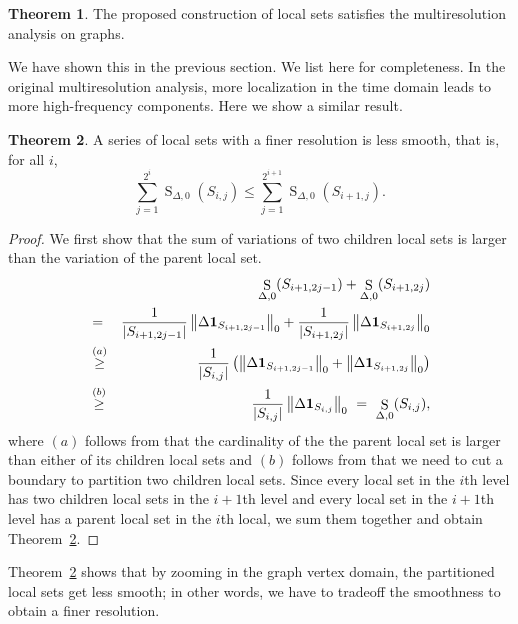 \documentclass[journal,twocolumn,10pt]{IEEEtran}
\theoremstyle{definition}
\newtheorem{myThm}{Theorem}
\DeclareMathOperator{\STV}{S}
\begin{document}
\begin{myThm}
\label{thm:MRA}
The proposed construction of local sets satisfies the multiresolution analysis on graphs.
\end{myThm}
We have shown this in the previous section. We list here for completeness. In the original multiresolution analysis, more localization in the  time domain leads to more high-frequency components. Here we show a similar result.
\begin{myThm}
\label{thm:smooth}
A series of local sets with a finer resolution is less smooth, that is, for all $i$,
\begin{equation*}
\sum_{j=1}^{2^i} \STV_{\Delta, 0} (S_{i,j}) \leq  \sum_{j=1}^{2^{i+1}}  \STV_{\Delta, 0}  (S_{i+1,j}) .
\end{equation*}
\end{myThm}
\begin{proof}
We first show that the sum of variations of two children local sets is larger than the variation of the parent local set.
\begin{eqnarray*}
&& \STV_{\Delta, 0} (S_{i+1,2j-1}) + \STV_{\Delta, 0} (S_{i+1,2j})  
\\
& = & \frac{1}{ |S_{i+1,2j-1}| }\left\| \Delta {\bf 1}_{ S_{i+1,2j-1} } \right\|_0 + 
\frac{1}{ |S_{i+1,2j}| }\left\| \Delta {\bf 1}_{ S_{i+1,2j} } \right\|_0
\\
& \stackrel{(a)}{ \geq } &  \frac{1}{ |S_{i,j}| }  \left(  \left\| \Delta {\bf 1}_{ S_{i+1,2j-1} } \right\|_0 + \left\| \Delta {\bf 1}_{ S_{i+1,2j} }  \right\|_0 \right)
\\
& \stackrel{(b)}{\geq} &  \frac{1}{ |S_{i,j}| }\left\| \Delta {\bf 1}_{S_{i,j}} \right\|_0 \ = \ \STV_{\Delta, 0}  (S_{i,j}),
\end{eqnarray*}
where $(a)$ follows from that the cardinality of the the parent local set is larger than either of its children local sets and $(b)$ follows from that we need to cut a boundary to partition two children local sets. Since every local set in the $i$th level has two children local sets in the $i+1$th level and every local set in the $i+1$th level has a parent local set in the $i$th local, we sum them together and obtain Theorem~\ref{thm:smooth}.
\end{proof}

Theorem~\ref{thm:smooth} shows that  by zooming in the graph vertex domain, the partitioned local sets get less smooth; in other words, we have to tradeoff the smoothness to obtain a finer resolution.
\end{document}
